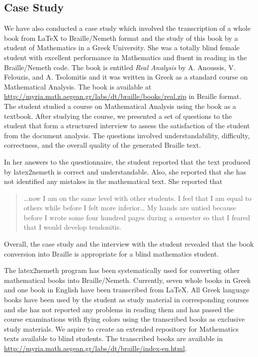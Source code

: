 \documentclass[11.5pt]{sig-alternate} %
\begin{document}
\begin{large}
\subsection*{Case Study}

We have also conducted a case study which involved the transcription of a whole book from LaTeX to Braille/Nemeth format and the study of this book by a student of Mathematics in a Greek University. She was a totally blind female student with excellent performance in Mathematics and fluent in reading in the Braille/Nemeth code. The book is entitled \textit{Real Analysis} by A. Anoussis, V. Felouzis, and A. Tsolomitis and it was written in Greek as a standard course on Mathematical Analysis. The book is available at \url{http://myria.math.aegean.gr/labs/dt/braille/books/real.zip} in Braille format. The student studied a course on Mathematical Analysis using the book as a textbook. After studying the course, we presented a set of questions to the student that form a structured interview to assess the satisfaction of the student from the document analysis. The questions involved understandability, difficulty, correctness, and the overall quality of the generated Braille text.

In her answers to the questionnaire, the student reported that the text produced by latex2nemeth is correct and understandable. Also, she reported that she has not identified any mistakes in the mathematical text. She reported that

\begin{quote}
…now I am on the same level with other students. I feel that I am equal to others while before I felt more inferior… My hands are untied because before I wrote some four hundred pages during a semester so that I feared that I would develop tendonitis.
\end{quote}

Overall, the case study and the interview with the student revealed that the book conversion into Braille is appropriate for a blind mathematics student.

The latex2nemeth program has been systematically used for converting other mathematical books into Braille/Nemeth. Currently, seven whole books in Greek and one book in English have been transcribed from LaTeX. All Greek language books have been used by the student as study material in corresponding courses and she has not reported any problems in reading them and has passed the course examinations with flying colors using the transcribed books as exclusive study materials. We aspire to create an extended repository for Mathematics texts available to blind students. The transcribed books are available in \url{http://myria.math.aegean.gr/labs/dt/braille/index-en.html}.


\end{large}
\end{document}
